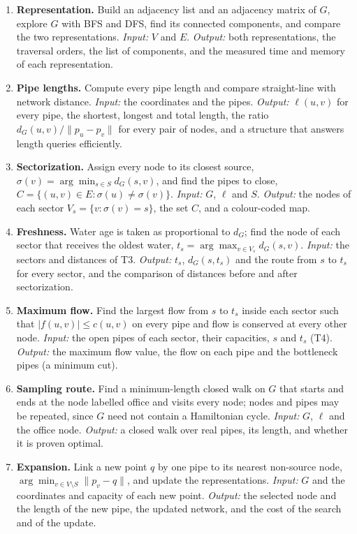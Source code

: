 \begin{enumerate}
    \item[\textbf{T1}] \textbf{Representation.} Build an adjacency list and an adjacency matrix of $G$, explore $G$ with BFS and DFS, find its connected components, and compare the two representations. \emph{Input:} $V$ and $E$. \emph{Output:} both representations, the traversal orders, the list of components, and the measured time and memory of each representation.
    \item[\textbf{T2}] \textbf{Pipe lengths.} Compute every pipe length and compare straight-line with network distance. \emph{Input:} the coordinates and the pipes. \emph{Output:} $\ell(u,v)$ for every pipe, the shortest, longest and total length, the ratio $d_G(u,v)/\lVert p_u-p_v\rVert$ for every pair of nodes, and a structure that answers length queries efficiently.
    \item[\textbf{T3}] \textbf{Sectorization.} Assign every node to its closest source, $\sigma(v)=\arg\min_{s\in S}d_G(s,v)$, and find the pipes to close, $C=\{(u,v)\in E:\sigma(u)\neq\sigma(v)\}$. \emph{Input:} $G$, $\ell$ and $S$. \emph{Output:} the nodes of each sector $V_s=\{v:\sigma(v)=s\}$, the set $C$, and a colour-coded map.
    \item[\textbf{T4}] \textbf{Freshness.} Water age is taken as proportional to $d_G$; find the node of each sector that receives the oldest water, $t_s=\arg\max_{v\in V_s}d_G(s,v)$. \emph{Input:} the sectors and distances of T3. \emph{Output:} $t_s$, $d_G(s,t_s)$ and the route from $s$ to $t_s$ for every sector, and the comparison of distances before and after sectorization.
    \item[\textbf{T5}] \textbf{Maximum flow.} Find the largest flow from $s$ to $t_s$ inside each sector such that $|f(u,v)|\le c(u,v)$ on every pipe and flow is conserved at every other node. \emph{Input:} the open pipes of each sector, their capacities, $s$ and $t_s$ (T4). \emph{Output:} the maximum flow value, the flow on each pipe and the bottleneck pipes (a minimum cut).
    \item[\textbf{T6}] \textbf{Sampling route.} Find a minimum-length closed walk on $G$ that starts and ends at the node labelled office and visits every node; nodes and pipes may be repeated, since $G$ need not contain a Hamiltonian cycle. \emph{Input:} $G$, $\ell$ and the office node. \emph{Output:} a closed walk over real pipes, its length, and whether it is proven optimal.
    \item[\textbf{T7}] \textbf{Expansion.} Link a new point $q$ by one pipe to its nearest non-source node, $\arg\min_{v\in V\setminus S}\lVert p_v-q\rVert$, and update the representations. \emph{Input:} $G$ and the coordinates and capacity of each new point. \emph{Output:} the selected node and the length of the new pipe, the updated network, and the cost of the search and of the update.
\end{enumerate}

